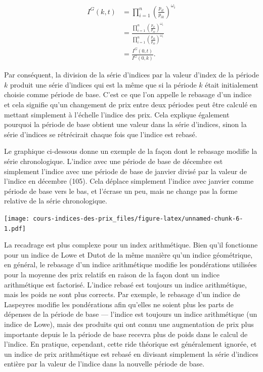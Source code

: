 \documentclass[]{article}
\begin{document}
\begin{align*}
I^{G}(k, t) & = \prod_{i = 1}^{n} \left (\frac{p_{it}}{p_{ik}} \right)^{\omega_{i} } \\
& = \frac{\prod_{i = 1}^{n} \left (\frac{p_{it}}{p_{i0}} \right)^{\omega_{i}}}{\prod_{i = 1}^{n} \left (\frac{p_{ik}}{p_{i0}} \right)^{\omega_{i}}} \\
& = \frac{I^{G}(0, t)}{I^{G}(0, k)}.
\end{align*}

Par conséquent, la division de la série d'indices par la valeur d'index de la période \(k\) produit une série d'indices qui est la même que si la période \(k\) était initialement choisie comme période de base. C'est ce que l'on appelle le rebasage d'un indice et cela signifie qu'un changement de prix entre deux périodes peut être calculé en mettant simplement à l'échelle l'indice des prix. Cela explique également pourquoi la période de base obtient une valeur dans la série d'indices, sinon la série d'indices se rétrécirait chaque fois que l'indice est rebasé.

Le graphique ci-dessous donne un exemple de la façon dont le rebasage modifie la série chronologique. L'indice avec une période de base de décembre est simplement l'indice avec une période de base de janvier divisé par la valeur de l'indice en décembre (105). Cela déplace simplement l'indice avec janvier comme période de base vers le bas, et l'écrase un peu, mais ne change pas la forme relative de la série chronologique.

\texttt{[image: cours-indices-des-prix\_files/figure-latex/unnamed-chunk-6-1.pdf]}

La recadrage est plus complexe pour un index arithmétique. Bien qu'il fonctionne pour un indice de Lowe et Dutot de la même manière qu'un indice géométrique, en général, le rebasage d'un indice arithmétique modifie les pondérations utilisées pour la moyenne des prix relatifs en raison de la façon dont un indice arithmétique est factorisé. L'indice rebasé est toujours un indice arithmétique, mais les poids ne sont plus corrects. Par exemple, le rebasage d'un indice de Laspeyres modifie les pondérations afin qu'elles ne soient plus les parts de dépenses de la période de base --- l'indice est toujours un indice arithmétique (un indice de Lowe), mais des produits qui ont connu une augmentation de prix plus importante depuis le la période de base recevra plus de poids dans le calcul de l'indice. En pratique, cependant, cette ride théorique est généralement ignorée, et un indice de prix arithmétique est rebasé en divisant simplement la série d'indices entière par la valeur de l'indice dans la nouvelle période de base.
\end{document}
